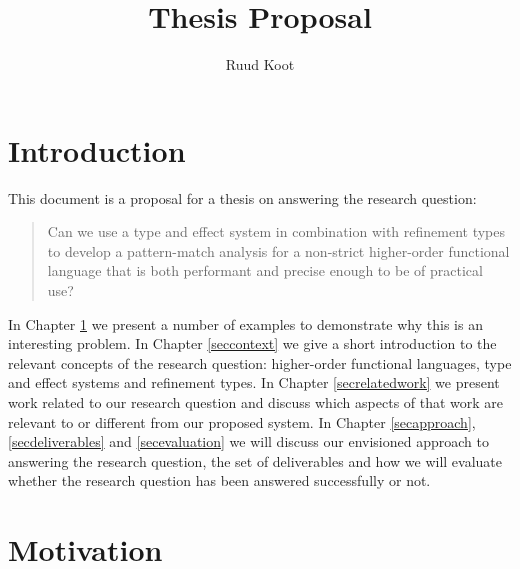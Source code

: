 \documentclass[a4paper]{report}
\begin{document}
\title{Thesis Proposal}
\author{Ruud Koot}
\maketitle


\chapter*{Introduction}

This document is a proposal for a thesis on answering the research question:
\begin{quote}
Can we use a type and effect system in combination with refinement types to develop a pattern-match analysis for a non-strict higher-order functional language that is both performant and precise enough to be of practical use?
\end{quote}

In Chapter \ref{secmotivation} we present a number of examples to demonstrate why this is an interesting problem. In Chapter \ref{seccontext} we give a short introduction to the relevant concepts of the research question: higher-order functional languages, type and effect systems and refinement types. In Chapter \ref{secrelatedwork} we present work related to our research question and discuss which aspects of that work are relevant to or different from our proposed system. In Chapter \ref{secapproach}, \ref{secdeliverables} and \ref{secevaluation} we will discuss our envisioned approach to answering the research question, the set of deliverables and how we will evaluate whether the research question has been answered successfully or not.

\chapter{Motivation}\label{secmotivation}
\end{document}
